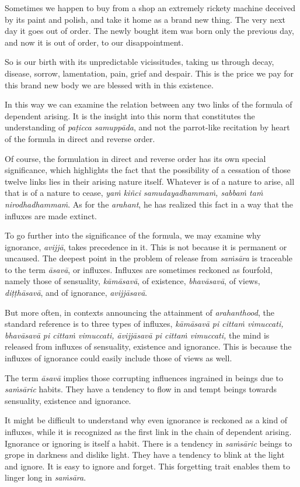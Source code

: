 Sometimes we happen to buy from a shop an extremely rickety machine deceived by its paint and polish, and take it home as a brand new thing. The very next day it goes out of order. The newly bought item was born only the previous day, and now it is out of order, to our disappointment.

So is our birth with its unpredictable vicissitudes, taking us through decay, disease, sorrow, lamentation, pain, grief and despair. This is the price we pay for this brand new body we are blessed with in this existence.

In this way we can examine the relation between any two links of the formula of dependent arising. It is the insight into this norm that constitutes the understanding of \emph{paṭicca samuppāda}, and not the parrot-like recitation by heart of the formula in direct and reverse order.

Of course, the formulation in direct and reverse order has its own special significance, which highlights the fact that the possibility of a cessation of those twelve links lies in their arising nature itself. Whatever is of a nature to arise, all that is of a nature to cease, \emph{yaṁ kiñci samudayadhammaṁ, sabbaṁ taṁ nirodhadhammaṁ}. As for the \emph{arahant}, he has realized this fact in a way that the influxes are made extinct.

To go further into the significance of the formula, we may examine why ignorance, \emph{avijjā}, takes precedence in it. This is not because it is permanent or uncaused. The deepest point in the problem of release from \emph{saṁsāra} is traceable to the term \emph{āsavā}, or influxes. Influxes are sometimes reckoned as fourfold, namely those of sensuality, \emph{kāmāsavā}, of existence, \emph{bhavāsavā}, of views, \emph{diṭṭhāsavā}, and of ignorance, \emph{avijjāsavā}.

But more often, in contexts announcing the attainment of \emph{arahanthood}, the standard reference is to three types of influxes, \emph{kāmāsavā pi cittaṁ vimuccati, bhavāsavā pi cittaṁ vimuccati, āvijjāsavā pi cittaṁ vimuccati,} the mind is released from influxes of sensuality, existence and ignorance. This is because the influxes of ignorance could easily include those of views as well.

The term \emph{āsavā} implies those corrupting influences ingrained in beings due to \emph{saṁsāric} habits. They have a tendency to flow in and tempt beings towards sensuality, existence and ignorance.

It might be difficult to understand why even ignorance is reckoned as a kind of influxes, while it is recognized as the first link in the chain of dependent arising. Ignorance or ignoring is itself a habit. There is a tendency in \emph{saṁsāric} beings to grope in darkness and dislike light. They have a tendency to blink at the light and ignore. It is easy to ignore and forget. This forgetting trait enables them to linger long in \emph{saṁsāra}.

